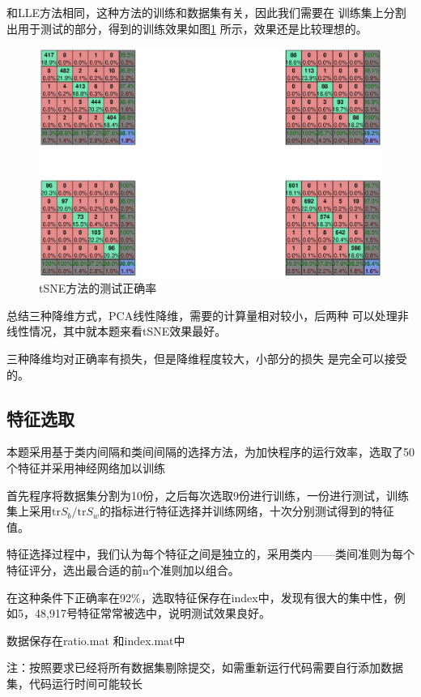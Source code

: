 \documentclass[UTF8,a4paper]{paper}
\begin{document}
和LLE方法相同，这种方法的训练和数据集有关，因此我们需要在
训练集上分割出用于测试的部分，得到的训练效果如图\ref{fig8}
所示，效果还是比较理想的。

\begin{figure}
\centering
\includegraphics[width = \textwidth]{NNtsne.eps}
\caption{tSNE方法的测试正确率}
\label{fig8}
\end{figure}

总结三种降维方式，PCA线性降维，需要的计算量相对较小，后两种
可以处理非线性情况，其中就本题来看tSNE效果最好。

三种降维均对正确率有损失，但是降维程度较大，小部分的损失
是完全可以接受的。

\subsection{特征选取}
本题采用基于类内间隔和类间间隔的选择方法，为加快程序的运行效率，选取了50个特征并采用神经网络加以训练

首先程序将数据集分割为10份，之后每次选取9份进行训练，一份进行测试，训练集上采用$\mathrm{tr}S_b/\mathrm{tr}S_w$的指标进行特征选择并训练网络，十次分别测试得到的特征值。

特征选择过程中，我们认为每个特征之间是独立的，采用类内——类间准则为每个特征评分，选出最合适的前n个准则加以组合。

在这种条件下正确率在92\%，选取特征保存在index中，发现有很大的集中性，例如5，48,917号特征常常被选中，说明测试效果良好。

数据保存在ratio.mat 和index.mat中

注：按照要求已经将所有数据集剔除提交，如需重新运行代码需要自行添加数据集，代码运行时间可能较长
\end{document}
